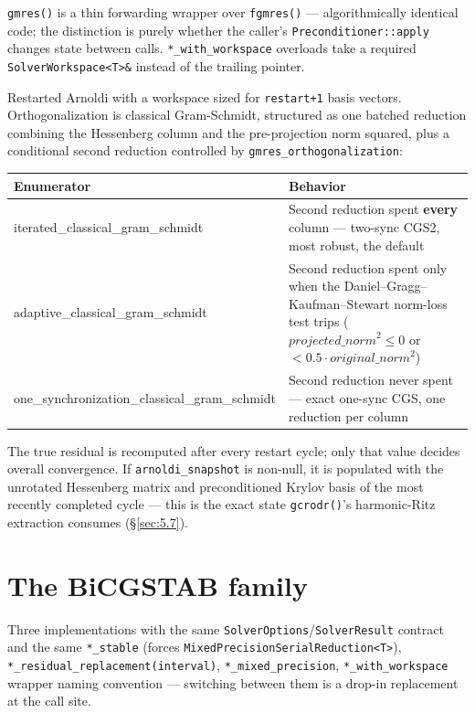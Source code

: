 \documentclass[11pt,a4paper]{report}
\newcommand{\secref}[1]{\S\ref{#1}}
\begin{document}
\lstinline!gmres()! is a thin forwarding wrapper over \lstinline!fgmres()! ---
algorithmically identical code; the distinction is purely whether the
caller's \lstinline!Preconditioner::apply! changes state between calls.
\lstinline!*_with_workspace! overloads take a required \lstinline!SolverWorkspace<T>&!
instead of the trailing pointer.

Restarted Arnoldi with a workspace sized for \lstinline!restart+1! basis
vectors. Orthogonalization is classical Gram-Schmidt, structured as one
batched reduction combining the Hessenberg column and the
pre-projection norm squared, plus a conditional second reduction
controlled by \lstinline!gmres_orthogonalization!:

\begin{longtable}{L{0.34\textwidth}P{0.56\textwidth}}
\toprule
Enumerator & Behavior \\
\midrule
\endhead
iterated\_classical\_gram\_schmidt & Second reduction spent \textbf{every} column --- two-sync CGS2, most robust, the default \\
adaptive\_classical\_gram\_schmidt & Second reduction spent only when the Daniel--Gragg--Kaufman--Stewart norm-loss test trips ($\mathit{projected\_norm}^2 \leq 0$ or $< 0.5\cdot\mathit{original\_norm}^2$) \\
one\_synchronization\_classical\_gram\_schmidt & Second reduction never spent --- exact one-sync CGS, one reduction per column \\
\bottomrule
\end{longtable}

The true residual is recomputed after every restart cycle; only that
value decides overall convergence. If \lstinline!arnoldi_snapshot! is
non-null, it is populated with the unrotated Hessenberg matrix and
preconditioned Krylov basis of the most recently completed cycle ---
this is the exact state \lstinline!gcrodr()!'s harmonic-Ritz extraction
consumes (\secref{sec:5.7}).

\section{The BiCGSTAB family}
\label{sec:5.5}

Three implementations with the same \lstinline!SolverOptions!/\lstinline!SolverResult!
contract and the same \lstinline!*_stable! (forces
\lstinline!MixedPrecisionSerialReduction<T>!), \lstinline!*_residual_replacement(interval)!,
\lstinline!*_mixed_precision!, \lstinline!*_with_workspace! wrapper naming convention
--- switching between them is a drop-in replacement at the call site.
\end{document}
